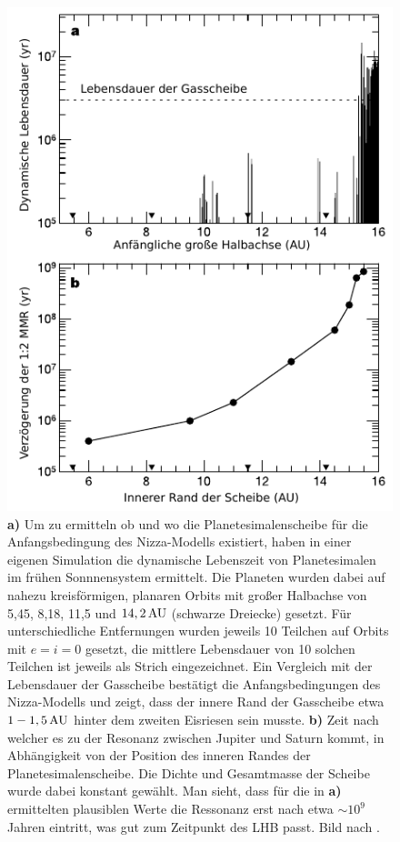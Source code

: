 \documentclass[12pt,a4paper,twoside]{article}
\renewcommand{\cite}{\citep}
\begin{document}
\begin{figure}[tbn]
\centering
\includegraphics[scale=1]{img/Gomes2005-1.pdf}
\caption{\textbf{a)} Um zu ermitteln ob und wo die Planetesimalenscheibe für die Anfangsbedingung des Nizza-Modells existiert, haben \cite{Gomes2005} in einer eigenen Simulation die dynamische Lebenszeit von Planetesimalen im frühen Sonnnensystem ermittelt. Die Planeten wurden dabei auf nahezu kreisförmigen, planaren Orbits mit großer Halbachse von 5,45, 8,18, 11,5 und $\unit[14,2]{AU}$ (schwarze Dreiecke) gesetzt. Für unterschiedliche Entfernungen wurden jeweils 10 Teilchen auf Orbits mit $e=i=0$ gesetzt, die mittlere Lebensdauer von 10 solchen Teilchen ist jeweils als Strich eingezeichnet. Ein Vergleich mit der Lebensdauer der Gasscheibe bestätigt die Anfangsbedingungen des Nizza-Modells und zeigt, dass der innere Rand der Gasscheibe etwa $\unit[1-1,5]{AU}$ hinter dem zweiten Eisriesen sein musste.
\textbf{b)} Zeit nach welcher es zu der Resonanz zwischen Jupiter und Saturn kommt, in Abhängigkeit von der Position des inneren Randes der Planetesimalenscheibe. Die Dichte und Gesamtmasse der Scheibe wurde dabei konstant gewählt. Man sieht, dass für die in {\textbf{a)}} ermittelten plausiblen Werte die Ressonanz erst nach etwa $\sim10^9$ Jahren eintritt, was gut zum Zeitpunkt des LHB passt. Bild nach \cite{Gomes2005}.}
\label{fig:LHBtiming}
\end{figure} %
\end{document}
